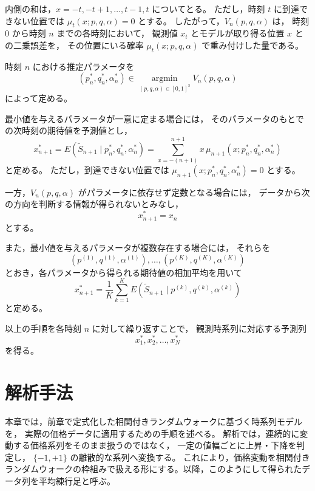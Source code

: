 \documentclass[a4j,dvipdfmx]{jsarticle}
\theoremstyle{plainnote}
\begin{document}
内側の和は，$x=-t,-t+1,\ldots,t-1,t$ についてとる。
ただし，時刻 $t$ に到達できない位置では
$\mu_t(x;p,q,\alpha)=0$ とする。
したがって，$V_n(p,q,\alpha)$ は，
時刻 $0$ から時刻 $n$ までの各時刻において，
観測値 $x_t$ とモデルが取り得る位置 $x$ との二乗誤差を，
その位置にいる確率 $\mu_t(x;p,q,\alpha)$ で重み付けした量である。

時刻 $n$ における推定パラメータを
\begin{equation}
  (p_n^\ast,q_n^\ast,\alpha_n^\ast)
  \in
  \operatorname*{argmin}_{(p,q,\alpha)\in[0,1]^3}
  V_n(p,q,\alpha)
  \label{eq:model_argmin}
\end{equation}
によって定める。

最小値を与えるパラメータが一意に定まる場合には，
そのパラメータのもとでの次時刻の期待値を予測値とし，
\begin{equation}
  x_{n+1}^{\ast}
  =
  E(\tilde{S}_{n+1}\mid p_n^\ast,q_n^\ast,\alpha_n^\ast)
  =
  \sum_{x=-(n+1)}^{n+1}
  x\,\mu_{n+1}(x;p_n^\ast,q_n^\ast,\alpha_n^\ast)
  \label{eq:model_prediction}
\end{equation}
と定める。
ただし，到達できない位置では
$\mu_{n+1}(x;p_n^\ast,q_n^\ast,\alpha_n^\ast)=0$ とする。

一方，$V_n(p,q,\alpha)$ がパラメータに依存せず定数となる場合には，
データから次の方向を判断する情報が得られないとみなし，
\begin{equation}
  x_{n+1}^{\ast}=x_n
  \label{eq:model_prediction_const}
\end{equation}
とする。

また，最小値を与えるパラメータが複数存在する場合には，
それらを
\[
  (p^{(1)},q^{(1)},\alpha^{(1)}),\ldots,
  (p^{(K)},q^{(K)},\alpha^{(K)})
\]
とおき，各パラメータから得られる期待値の相加平均を用いて
\begin{equation}
  x_{n+1}^{\ast}
  =
  \frac{1}{K}
  \sum_{k=1}^{K}
  E(\tilde{S}_{n+1}\mid p^{(k)},q^{(k)},\alpha^{(k)})
  \label{eq:model_prediction_multiple}
\end{equation}
と定める。

以上の手順を各時刻 $n$ に対して繰り返すことで，
観測時系列に対応する予測列
\[
  x_1^\ast,x_2^\ast,\ldots,x_N^\ast
\]
を得る。
\newpage
\section{解析手法}

本章では，前章で定式化した相関付きランダムウォークに基づく時系列モデルを，
実際の価格データに適用するための手順を述べる。
解析では，連続的に変動する価格系列をそのまま扱うのではなく，
一定の値幅ごとに上昇・下降を判定し，
$\{-1,+1\}$ の離散的な系列へ変換する。
これにより，価格変動を相関付きランダムウォークの枠組みで扱える形にする。以降，このようにして得られたデータ列を平均練行足と呼ぶ。
\end{document}
